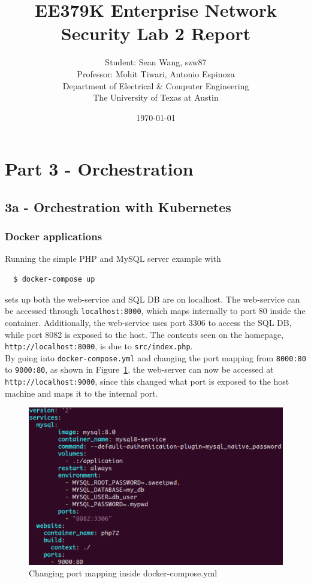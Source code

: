 \documentclass[11pt]{article}
\author{Student: Sean Wang, szw87 \\ Professor: Mohit Tiwari, Antonio Espinoza \\ Department of Electrical \& Computer Engineering \\ The University of Texas at Austin}
\date{\today}
\title{EE379K Enterprise Network Security Lab 2 Report}
\begin{document}
\maketitle
\section*{Part 3 - Orchestration}
\subsection*{3a - Orchestration with Kubernetes}
\subsubsection*{Docker applications}
Running the simple PHP and MySQL server example with
\begin{verbatim}
  $ docker-compose up
\end{verbatim}
sets up both the web-service and SQL DB are on localhost. The web-service can be accessed through \verb|localhost:8000|,
which maps internally to port 80 inside the container. Additionally, the web-service uses port 3306 to access the SQL DB,
while port 8082 is exposed to the host. The contents seen on the homepage, \verb|http://localhost:8000|, is due to
\verb|src/index.php|. \\
By going into \verb|docker-compose.yml| and changing the port mapping from \verb|8000:80| to \verb|9000:80|, as shown in
Figure~\ref{fig:port}, the web-server can now be accessed at \verb|http://localhost:9000|, since this changed what port is
exposed to the host machine and maps it to the internal port.
\clearpage
\begin{figure}[h!]
  \centering
  \includegraphics[width=1\linewidth]{./docker_port.png}
  \caption{\label{fig:port}
  Changing port mapping inside docker-compose.yml}
\end{figure}
\end{document}

